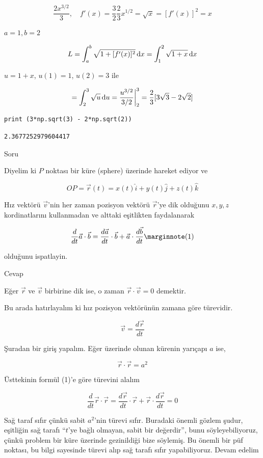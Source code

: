 \documentclass[12pt,fleqn]{article}\usepackage{../../common}
\begin{document}
$$
 \frac{2 x ^{3/2}}{3}, \quad f'(x) = \frac{3}{2} \frac{2}{3} x^{1/2} =
 \sqrt{x} = [f'(x)]^2 = x
$$

$a=1,b=2$

$$
L = \int_{a}^{b} \sqrt{ 1+ [f'(x)]^2} \,\mathrm{d} x = 
\int_{1}^{2} \sqrt{1 + x} \,\mathrm{d} x
$$

$u = 1 + x$, $u(1) = 1$, $u(2) = 3$ ile

$$
= \int_{2}^{3} \sqrt{u} \,\mathrm{d} u = \frac{u^{3/2}}{3/2} \bigg\vert_{2}^{3} = 
\frac{2}{3} [3 \sqrt{3} - 2\sqrt{2} ]
$$


\begin{verbatim}
print (3*np.sqrt(3) - 2*np.sqrt(2))
\end{verbatim}

\begin{verbatim}
2.3677252979604417
\end{verbatim}

\newpage

Soru

Diyelim ki $P$ noktası bir küre (sphere) üzerinde hareket ediyor ve 

$$ OP = \vec{r}(t) = x(t)\hat{i} + y(t)\hat{j} + z(t)\hat{k}  $$

Hız vektörü $\vec{v}$'nin her zaman pozisyon vektörü $\vec{r}$'ye dik
olduğunu $x,y,z$ kordinatlarını kullanmadan ve alttaki eşitlikten 
faydalanarak

$$
\frac{d}{dt}\vec{a} \cdot \vec{b} =  
\frac{d\vec{a}}{dt} \cdot \vec{b} +
\vec{a} \cdot \frac{d\vec{b}}{dt} 
\mlabel{1}
$$

olduğunu ispatlayin. 

Cevap

Eğer $\vec{r}$ ve $\vec{v}$ birbirine dik ise, o zaman $\vec{r} \cdot
\vec{v} = 0$ demektir. 

Bu arada hatırlayalım ki hız pozisyon vektörünün zamana göre türevidir. 

$$ \vec{v} = \frac{d\vec{r}}{dt} $$

Şuradan bir giriş yapalım. Eğer üzerinde olunan kürenin yarıçapı $a$ ise, 

$$ \vec{r} \cdot \vec{r} = a^2 $$

Üsttekinin formül (1)'e göre türevini alalım

$$ 
\frac{d}{dt}\vec{r} \cdot \vec{r} =  
\frac{d\vec{r}}{dt} \cdot \vec{r} +
\vec{r} \cdot \frac{d\vec{r}}{dt} = 0
 $$

Sağ taraf sıfır çünkü sabit $a^2$'nin türevi sıfır. Buradaki önemli gözlem
şudur, eşitliğin sağ tarafı ``$t$'ye bağlı olmayan, sabit bir değerdir'', bunu
söyleyebiliyoruz, çünkü problem bir küre üzerinde gezinildiği bize söylemiş. Bu
önemli bir püf noktası, bu bilgi sayesinde türevi alıp sağ tarafı sıfır
yapabiliyoruz. Devam edelim
\end{document}
